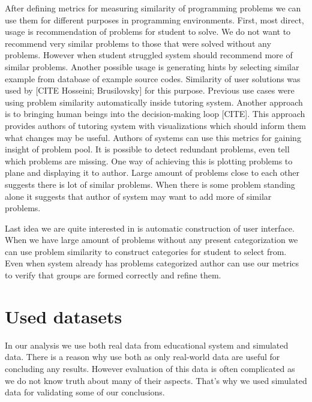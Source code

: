 \documentclass[
  digital, %
  table,   %
  nolof,     %
  nolot,     %
  nocover
]{fithesis3}
\begin{document}
After defining metrics for measuring similarity of programming problems we can use them for different purposes in programming environments. First, most direct, usage is recommendation of problems for
student to solve. We do not want to recommend very similar problems
to those that were solved without any problems. However when student struggled system should recommend more of similar problems.
Another possible usage is generating hints by selecting similar
example from database of example source codes. Similarity of user
solutions was used by [CITE Hosseini; Brusilovsky] for this purpose.
Previous use cases were using problem similarity automatically
inside tutoring system. Another approach is to bringing human beings
into the decision-making loop [CITE]. This approach provides authors of
tutoring system with visualizations which should inform them what
changes may be useful.
Authors of systems can use this metrics for gaining insight of problem pool. It is possible to detect redundant problems, even tell which
problems are missing. One way of achieving this is plotting problems
to plane and displaying it to author. Large amount of problems close to each other suggests there is lot of similar problems. When there is
some problem standing alone it suggests that author of system may
want to add more of similar problems.

Last idea we are quite interested in is automatic construction of
user interface. When we have large amount of problems without any
present categorization we can use problem similarity to construct
categories for student to select from. Even when system already has
problems categorized author can use our metrics to verify that groups
are formed correctly and refine them.

\section{Used datasets}\label{used-datasets}



In our analysis we use both real data from educational system and
simulated data. There is a reason why use both as only real-world data
are useful for concluding any results. However evaluation of this data
is often complicated as we do not know truth about many of their
aspects. That's why we used simulated data for validating some of our
conclusions.

\end{document}
